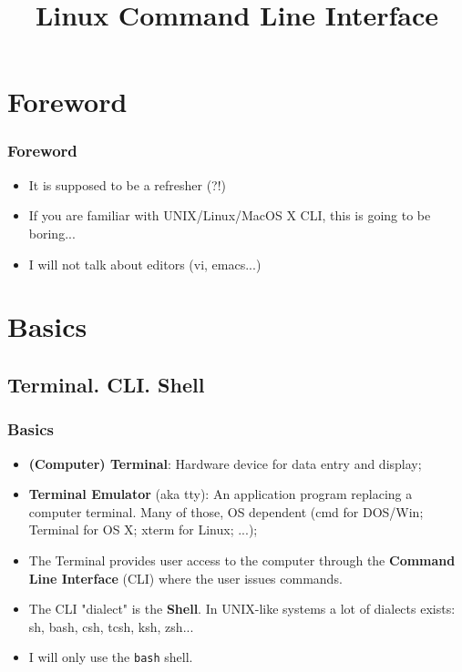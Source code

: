 \documentclass[utf8x,10pt]{beamer}
\title{Linux Command Line Interface}
\begin{document}
\maketitle{}

\section{Foreword}

\begin{frame}
  \frametitle{Foreword}

  \begin{itemize}
  \item It is supposed to be a refresher (?!)
  \item If you are familiar with UNIX/Linux/MacOS X CLI, this is going
    to be boring...
  \item I will not talk about editors (vi, emacs...)
  \end{itemize}
  \vfill
\end{frame}

\section{Basics}
\subsection{Terminal. CLI. Shell}
\begin{frame}
  \frametitle{Basics}

  \begin{itemize}
  \item \textbf{(Computer) Terminal}: Hardware device for data entry and
    display;
  \item \textbf{Terminal Emulator} (aka tty): An application program
    replacing a computer terminal. Many of those, OS dependent (cmd
    for DOS/Win; Terminal for OS X; xterm for Linux; ...);
  \item The Terminal provides user access to the computer through the
    \textbf{Command Line Interface} (CLI) where the user issues commands.
  \item The CLI "dialect" is the \textbf{Shell}. In UNIX-like systems
    a lot of dialects exists: sh, bash, csh, tcsh, ksh, zsh...
  \item I will only use the \texttt{bash} shell.
  \end{itemize}
\end{frame}
\end{document}
